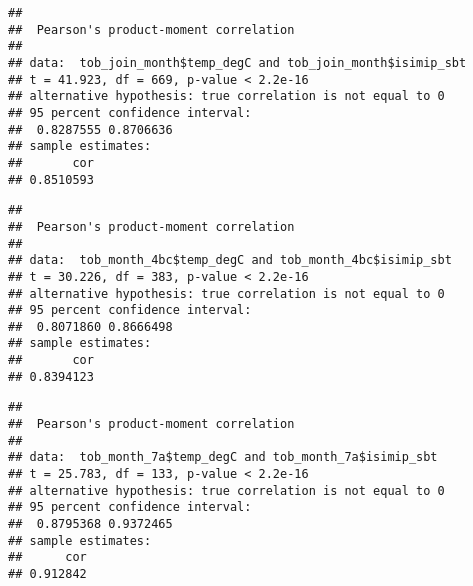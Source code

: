 \documentclass[
]{article}
\newenvironment{Shaded}{\begin{snugshade}}{\end{snugshade}}
\newcommand{\CommentTok}[1]{\textcolor[rgb]{0.56,0.35,0.01}{\textit{#1}}}
\newcommand{\FunctionTok}[1]{\textcolor[rgb]{0.00,0.00,0.00}{#1}}
\newcommand{\NormalTok}[1]{#1}
\newcommand{\OtherTok}[1]{\textcolor[rgb]{0.56,0.35,0.01}{#1}}
\newcommand{\SpecialCharTok}[1]{\textcolor[rgb]{0.00,0.00,0.00}{#1}}
\newcommand{\StringTok}[1]{\textcolor[rgb]{0.31,0.60,0.02}{#1}}
\begin{document}
\begin{verbatim}
## 
##  Pearson's product-moment correlation
## 
## data:  tob_join_month$temp_degC and tob_join_month$isimip_sbt
## t = 41.923, df = 669, p-value < 2.2e-16
## alternative hypothesis: true correlation is not equal to 0
## 95 percent confidence interval:
##  0.8287555 0.8706636
## sample estimates:
##       cor 
## 0.8510593
\end{verbatim}

\begin{Shaded}
\end{Shaded}

\begin{verbatim}
## 
##  Pearson's product-moment correlation
## 
## data:  tob_month_4bc$temp_degC and tob_month_4bc$isimip_sbt
## t = 30.226, df = 383, p-value < 2.2e-16
## alternative hypothesis: true correlation is not equal to 0
## 95 percent confidence interval:
##  0.8071860 0.8666498
## sample estimates:
##       cor 
## 0.8394123
\end{verbatim}

\begin{Shaded}
\end{Shaded}

\begin{verbatim}
## 
##  Pearson's product-moment correlation
## 
## data:  tob_month_7a$temp_degC and tob_month_7a$isimip_sbt
## t = 25.783, df = 133, p-value < 2.2e-16
## alternative hypothesis: true correlation is not equal to 0
## 95 percent confidence interval:
##  0.8795368 0.9372465
## sample estimates:
##      cor 
## 0.912842
\end{verbatim}
\end{document}
